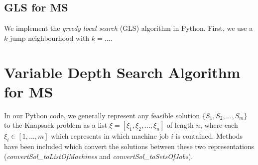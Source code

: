 \documentclass[12pt,a4paper,leqno]{article}
\begin{document}
\subsection*{GLS for MS}
We implement the \textit{greedy local search} (GLS) algorithm in Python. First, we use a $k$-jump neighbourhood with $k=...$. \\

\newpage
\section{Variable Depth Search Algorithm for MS}

In our Python code, we generally represent any feasible solution $\{S_1,S_2,...,S_m\}$ to the Knapsack problem as a list $\xi = [\xi_1,\xi_2,...,\xi_n]$ of length $n$, where each $\xi_i \in [1,...,m]$ which represents in which machine job $i$ is contained. Methods have been included which convert the solutions between these two representations (\textit{convertSol\_toListOfMachines} and \textit{convertSol\_toSetsOfJobs}). \\
\end{document}
